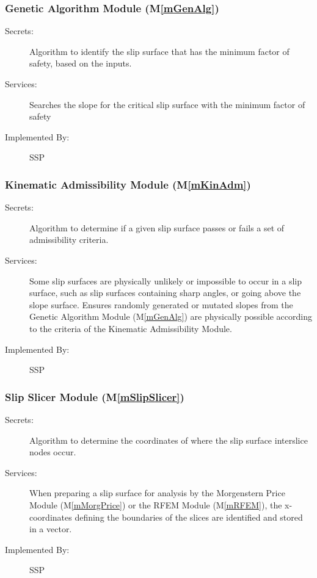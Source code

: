 \documentclass[12pt]{article}
\newcommand{\progname}{SSP}
\newcommand{\mref}[1]{M\ref{#1}}
\begin{document}
\subsubsection{Genetic Algorithm Module (\mref{mGenAlg})}

\begin{description}
\item[Secrets:] Algorithm to identify the slip surface that has the
  minimum factor of safety, based on the inputs.
\item[Services:] Searches the slope for the critical slip surface with
  the minimum factor of safety 
\item[Implemented By:] \progname
\end{description}


\subsubsection{Kinematic Admissibility Module (\mref{mKinAdm})}

\begin{description}
\item[Secrets:] Algorithm to determine if a given slip surface passes
  or fails a set of admissibility criteria.
\item[Services:] Some slip surfaces are physically unlikely or
  impossible to occur in a slip surface, such as slip surfaces
  containing sharp angles, or going above the slope surface. Ensures
  randomly generated or mutated slopes from the Genetic Algorithm
  Module (\mref{mGenAlg}) are physically possible according to the
  criteria of the Kinematic Admissibility Module.
\item[Implemented By:] \progname
\end{description} 


\subsubsection{Slip Slicer Module (\mref{mSlipSlicer})}

\begin{description}
\item[Secrets:] Algorithm to determine the coordinates of where the
  slip surface interslice nodes occur.
\item[Services:] When preparing a slip surface for analysis by the
  Morgenstern Price Module (\mref{mMorgPrice}) or the RFEM Module
  (\mref{mRFEM}), the x-coordinates defining the boundaries of the
  slices are identified and stored in a vector.
\item[Implemented By:] \progname
\end{description} 
\end{document}

